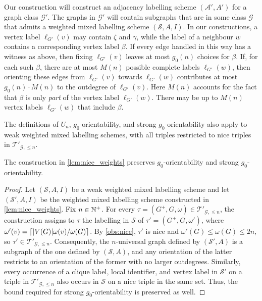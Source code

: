 \documentclass{patmorin}
\renewcommand{\le}{\leqslant}
\DeclarePairedDelimiter{\ceil}{\lceil}{\rceil}
\newcommand{\calA}{\mathcal{A}}
\newcommand{\calG}{\mathcal{G}}
\newcommand{\calS}{\mathcal{S}}
\newcommand{\calT}{\mathcal{T}}
\begin{document}
Our construction will construct an adjacency labelling scheme $(\calA',A')$ for a graph class $\calG'$. The graphs in $\calG'$ will contain subgraphs that are in some class $\calG$ that admits a weighted mixed labelling scheme $(\calS,A,I)$.  In our constructions, a vertex label $\ell_{G'}(v)$ may contain $\zeta$ and $\gamma$, while the label of a neighbour $w$ contains a corresponding vertex label $\beta$. If every edge handled in this way has a witness as above, then fixing $\ell_{G'}(v)$ leaves at most $g_0(n)$ choices for $\beta$. If, for each such $\beta$, there are at most $M(n)$ possible complete labels $\ell_{G'}(w)$, then orienting these edges from $\ell_{G'}(v)$ towards $\ell_{G'}(w)$ contributes at most $g_0(n)\cdot M(n)$ to the outdegree of $\ell_{G'}(v)$. Here $M(n)$ accounts for the fact that $\beta$ is only \emph{part} of the vertex label $\ell_{G'}(w)$. There may be up to $M(n)$ vertex labels $\ell_{G'}(w)$ that include $\beta$.



The definitions of $U_n$, $g_0$-orientability, and strong $g_0$-orientability also apply to weak weighted mixed labelling schemes, with all triples restricted to nice triples in $\calT'_{\calG,\le n}$.

\begin{obs}\label{obs:normalization_orientability}
  The construction in \cref{lem:nice_weights} preserves $g_0$-orientability and strong $g_0$-orientability.
\end{obs}
\begin{proof}
  Let $(\calS,A,I)$ be a weak weighted mixed labelling scheme and let $(\calS',A,I)$ be the weighted mixed labelling scheme constructed in \cref{lem:nice_weights}. Fix $n\in\mathbb{N}^+$. For every $\tau=(G^+,G,\omega)\in\calT'_{\calG,\le n}$, the construction assigns to $\tau$ the labelling in $\calS$ of $\tau'=(G^+,G,\omega')$, where $\omega'(v)=\ceil{|V(G)|\omega(v)/\omega(G)}$. By \cref{obs:nice}, $\tau'$ is nice and $\omega'(G)\le\omega(G)\le 2n$, so $\tau'\in\calT'_{\calG,\le n}$. Consequently, the $n$-universal graph defined by $(\calS',A)$ is a subgraph of the one defined by $(\calS,A)$, and any orientation of the latter restricts to an orientation of the former with no larger outdegrees. Similarly, every occurrence of a clique label, local identifier, and vertex label in $\calS'$ on a triple in $\calT'_{\calG,\le n}$ also occurs in $\calS$ on a nice triple in the same set. Thus, the bound required for strong $g_0$-orientability is preserved as well.
\end{proof}
\end{document}
